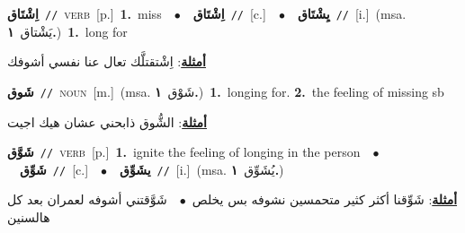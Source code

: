 \documentclass[10pt,a4paper,twoside]{article} %
\begin{document}
\begin{multicols}{2}
{\setlength\topsep{0pt}\textbf{\foreignlanguage{arabic}{اِشْتَاق}}\ {\color{gray}\texttt{//}\color{black}}\ \textsc{verb}\ [p.]\ \textbf{1.}~miss\ \ $\bullet$\ \ \setlength\topsep{0pt}\textbf{\foreignlanguage{arabic}{اِشْتَاق}}\ {\color{gray}\texttt{//}\color{black}}\ [c.]\ \ $\bullet$\ \ \setlength\topsep{0pt}\textbf{\foreignlanguage{arabic}{يِشْتَاق}}\ {\color{gray}\texttt{//}\color{black}}\ [i.]\ \color{gray}(msa. \foreignlanguage{arabic}{يَشْتاق}~\foreignlanguage{arabic}{\textbf{١.}})\color{black}\ \textbf{1.}~long for\  \begin{flushright}\color{gray}\foreignlanguage{arabic}{\textbf{\underline{\foreignlanguage{arabic}{أمثلة}}}: اِشْتقتلَّك تعال عنا نفسي أشوفك}\end{flushright}\color{black}} \vspace{2mm}

{\setlength\topsep{0pt}\textbf{\foreignlanguage{arabic}{شَوق}}\ {\color{gray}\texttt{//}\color{black}}\ \textsc{noun}\ [m.]\ \color{gray}(msa. \foreignlanguage{arabic}{شَوْق}~\foreignlanguage{arabic}{\textbf{١.}})\color{black}\ \textbf{1.}~longing for.  \textbf{2.}~the feeling of missing sb\  \begin{flushright}\color{gray}\foreignlanguage{arabic}{\textbf{\underline{\foreignlanguage{arabic}{أمثلة}}}: الشُّوق ذابحني عشان هيك اجيت}\end{flushright}\color{black}} \vspace{2mm}

{\setlength\topsep{0pt}\textbf{\foreignlanguage{arabic}{شَوَّق}}\ {\color{gray}\texttt{//}\color{black}}\ \textsc{verb}\ [p.]\ \textbf{1.}~ignite the feeling of longing in the person\ \ $\bullet$\ \ \setlength\topsep{0pt}\textbf{\foreignlanguage{arabic}{شَوِّق}}\ {\color{gray}\texttt{//}\color{black}}\ [c.]\ \ $\bullet$\ \ \setlength\topsep{0pt}\textbf{\foreignlanguage{arabic}{يشَوِّق}}\ {\color{gray}\texttt{//}\color{black}}\ [i.]\ \color{gray}(msa. \foreignlanguage{arabic}{يُشَوِّق}~\foreignlanguage{arabic}{\textbf{١.}})\color{black}\  \begin{flushright}\color{gray}\foreignlanguage{arabic}{\textbf{\underline{\foreignlanguage{arabic}{أمثلة}}}: شَوِّقنا أكثر كثير متحمسين نشوفه بس يخلص\ $\bullet$\ \  شَوَّقتني أشوفه لعمران بعد كل هالسنين}\end{flushright}\color{black}} \vspace{2mm}


\end{multicols}
\end{document}
